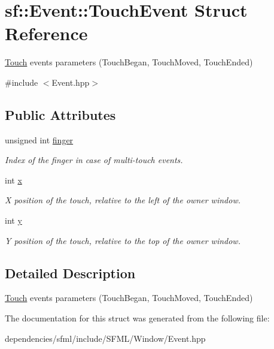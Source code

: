 \hypertarget{structsf_1_1_event_1_1_touch_event}{}\section{sf\+:\+:Event\+:\+:Touch\+Event Struct Reference}
\label{structsf_1_1_event_1_1_touch_event}


\hyperlink{classsf_1_1_touch}{Touch} events parameters (Touch\+Began, Touch\+Moved, Touch\+Ended)  




{\ttfamily \#include $<$Event.\+hpp$>$}

\subsection*{Public Attributes}
\begin{DoxyCompactItemize}
\item 
\mbox{\label{structsf_1_1_event_1_1_touch_event_a9a79fe86bf9ac3c16ec7326f96feb61a}} 
unsigned int \hyperlink{structsf_1_1_event_1_1_touch_event_a9a79fe86bf9ac3c16ec7326f96feb61a}{finger}
\begin{DoxyCompactList}\small\item\em Index of the finger in case of multi-\/touch events. \end{DoxyCompactList}\item 
\mbox{\label{structsf_1_1_event_1_1_touch_event_a8993963790b850caa68b98d3cad2be45}} 
int \hyperlink{structsf_1_1_event_1_1_touch_event_a8993963790b850caa68b98d3cad2be45}{x}
\begin{DoxyCompactList}\small\item\em X position of the touch, relative to the left of the owner window. \end{DoxyCompactList}\item 
\mbox{\label{structsf_1_1_event_1_1_touch_event_add80639dc68bc37e3275744d501cdbe0}} 
int \hyperlink{structsf_1_1_event_1_1_touch_event_add80639dc68bc37e3275744d501cdbe0}{y}
\begin{DoxyCompactList}\small\item\em Y position of the touch, relative to the top of the owner window. \end{DoxyCompactList}\end{DoxyCompactItemize}


\subsection{Detailed Description}
\hyperlink{classsf_1_1_touch}{Touch} events parameters (Touch\+Began, Touch\+Moved, Touch\+Ended) 

The documentation for this struct was generated from the following file\+:\begin{DoxyCompactItemize}
\item 
dependencies/sfml/include/\+S\+F\+M\+L/\+Window/Event.\+hpp\end{DoxyCompactItemize}
